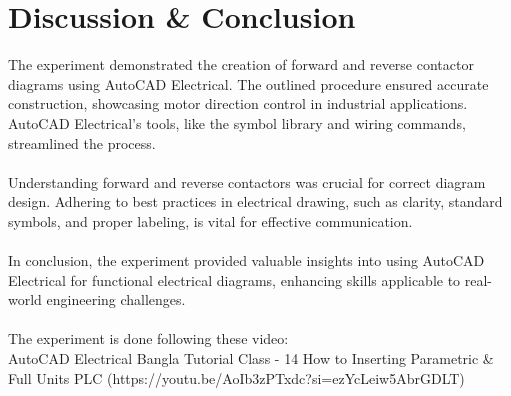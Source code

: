 \documentclass[12pt]{article}
\begin{document}
\section*{Discussion \& Conclusion}
The experiment demonstrated the creation of forward and reverse contactor diagrams using AutoCAD Electrical. The outlined procedure ensured accurate construction, showcasing motor direction control in industrial applications. AutoCAD Electrical's tools, like the symbol library and wiring commands, streamlined the process.
\\\\
Understanding forward and reverse contactors was crucial for correct diagram design. Adhering to best practices in electrical drawing, such as clarity, standard symbols, and proper labeling, is vital for effective communication.
\\\\
In conclusion, the experiment provided valuable insights into using AutoCAD Electrical for functional electrical diagrams, enhancing skills applicable to real-world engineering challenges.
\\\\
The experiment is done following these video:\\
AutoCAD Electrical Bangla Tutorial Class - 14 How to Inserting Parametric \& Full Units PLC (https://youtu.be/AoIb3zPTxdc?si=ezYcLeiw5AbrGDLT)



\renewcommand{\bibname}{References}

\end{document}
